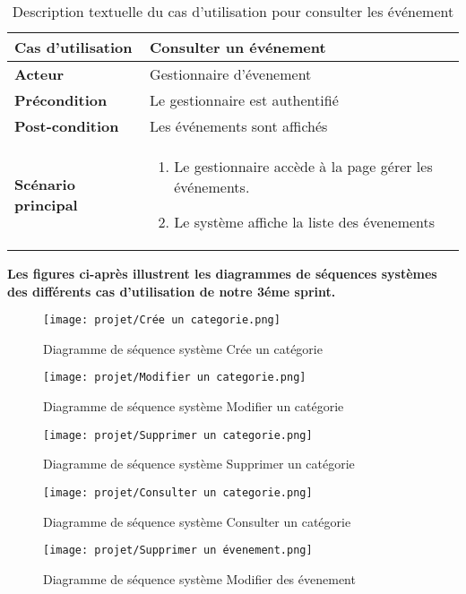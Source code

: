 \begin{longtable}{|>{\bfseries}p{4cm}|p{10cm}|}
\hline
Cas d’utilisation & Consulter un événement \\
\hline
Acteur & Gestionnaire d'évenement \\
\hline
Précondition & Le gestionnaire est authentifié \\
\hline
Post-condition & Les événements sont affichés \\
\hline
Scénario principal & 
\begin{enumerate}
  \item Le gestionnaire accède à la page gérer les événements.
  \item  Le système affiche la liste des évenements
 
\end{enumerate} 
\hline

\caption{Description textuelle du cas d’utilisation pour  consulter les  événement}
\end{longtable}
\textbf{Les figures ci-après illustrent les diagrammes de séquences systèmes des différents cas d’utilisation de notre 3éme sprint.}
\begin{figure}[H]
    \centering
    \texttt{[image: projet/Crée un categorie.png]}
    \caption{Diagramme de séquence système Crée un catégorie}
    \label{fig:diagramme3}
\end{figure}
\begin{figure}[H]
    \centering
    \texttt{[image: projet/Modifier un categorie.png]}
    \caption{Diagramme de séquence système Modifier un catégorie}
    \label{fig:diagramme3}
\end{figure}
\begin{figure}[H]
    \centering
    \texttt{[image: projet/Supprimer un categorie.png]}
    \caption{Diagramme de séquence système Supprimer un catégorie}
    \label{fig:diagramme3}
\end{figure}
\begin{figure}[H]
    \centering
    \texttt{[image: projet/Consulter un categorie.png]}
    \caption{Diagramme de séquence système Consulter un catégorie}
    \label{fig:diagramme3}
\end{figure}
\begin{figure}[H]
    \centering
    \texttt{[image: projet/Supprimer un évenement.png]}
    \caption{Diagramme de séquence système Modifier des évenement}
    \label{fig:diagramme3}
\end{figure}
